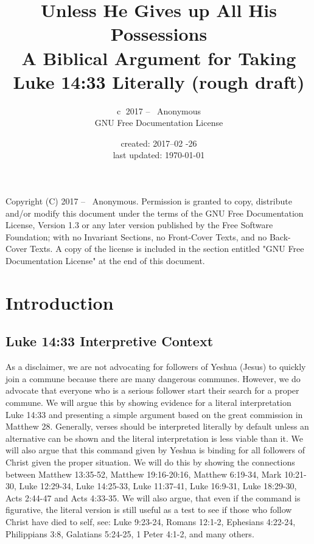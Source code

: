 \documentclass[11pt]{article}
\title{\textbf{Unless He Gives up All His Possessions} \large \\ A Biblical Argument for Taking Luke 14:33 Literally (rough draft) }
\author{\textcircled{c} 2017 -- \the\year \ Anonymous \\ GNU Free Documentation License  }
\date{created: 2017--02 -26 \\ last updated: \today{}}
\begin{document}
\maketitle
\tableofcontents 

\noindent \newline Copyright (C)  2017 -- \the\year \  Anonymous. \newline
Permission is granted to copy, distribute and/or modify this document\newline
under the terms of the GNU Free Documentation License, Version 1.3\newline
or any later version published by the Free Software Foundation;\newline
with no Invariant Sections, no Front-Cover Texts, and no Back-Cover Texts.\newline
A copy of the license is included in the section entitled "GNU\newline
Free Documentation License" at the end of this document.
\section{Introduction}
\subsection{Luke 14:33 Interpretive Context}
As a disclaimer, we are not advocating for followers of Yeshua (Jesus) to quickly join a commune because there are many dangerous communes. However, we do advocate that everyone who is a serious follower start their search for a proper commune. We will argue this by showing evidence for a literal interpretation Luke 14:33 and presenting a simple argument based on the great commission in Matthew 28. Generally, verses should be interpreted literally by default unless an alternative can be shown and the literal interpretation is less viable than it. We will also argue that this command given by Yeshua is binding for all followers of Christ given the proper situation. We will do this by showing the connections between Matthew 13:35-52, Matthew 19:16-20:16, Matthew 6:19-34, Mark 10:21-30, Luke 12:29-34, Luke 14:25-33, Luke 11:37-41, Luke 16:9-31, Luke 18:29-30, Acts 2:44-47 and Acts 4:33-35. We will also argue, that even if the command is figurative, the literal version is still useful as a test to see if those who follow Christ have died to self, see: Luke 9:23-24, Romans 12:1-2, Ephesians 4:22-24, Philippians 3:8, Galatians 5:24-25, 1 Peter 4:1-2, and many others.\cite{death to self verses} 
\end{document}
